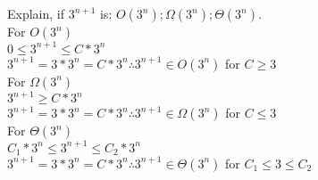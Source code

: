 \documentclass[12pt,largemargins]{homework}
\date{September 6, 2018}
\begin{document}
\maketitle
\question
Explain, if $3^{n + 1}$ is: $ O(3^n ) ; \Omega ( 3^n ) ; \Theta ( 3^n ) $.\\
For $O(3^n)$\\
$ 0\leq 3^{n+1} \leq C*3^n$ \\
$3^{n+1} = 3*3^n = C * 3^n \therefore 3^{n+1} \in O(3^n)$ for $ C\geq 3 $\\
For $\Omega (3^n)$\\
$3^{n+1} \geq C*3^n$\\
$3^{n+1} = 3*3^n = C * 3^n \therefore 3^{n+1} \in \Omega(3^n)$ for $ C\leq 3 $\\
For $\Theta (3^n)$\\
$C_1 * 3^n \leq 3^{n+1} \leq C_2*3^n$\\
$3^{n+1} = 3*3^n = C * 3^n \therefore 3^{n+1} \in \Theta(3^n)$ for $ C_1 \leq 3 \leq C_2$\\
\end{document}
